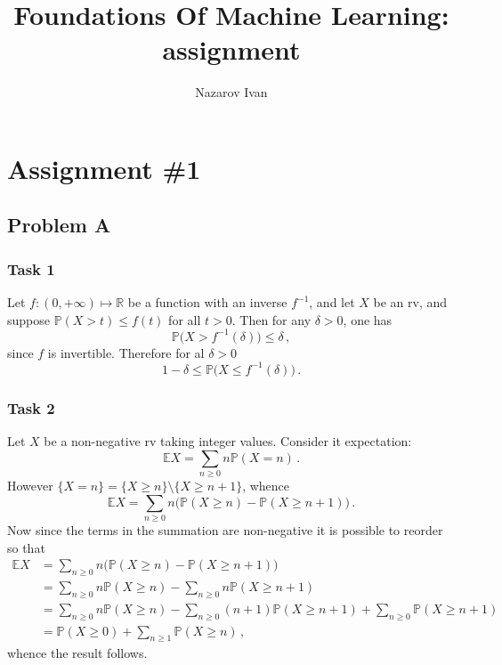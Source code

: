 \documentclass[a4paper]{article}
\title{Foundations Of Machine Learning: assignment}
\author{Nazarov Ivan}
\newcommand{\Real}{\mathbb{R}}
\newcommand{\ex}{\mathbb{E}}
\newcommand{\pr}{\mathbb{P}}
\begin{document}
\section{Assignment \#1} %
\label{sec:assignment_1}

\subsection{Problem A} %
\label{sub:problem_1a}

\subsubsection{Task 1} %
\label{ssub:task_1a1}

Let $f:(0, +\infty)\mapsto\Real$ be a function with an inverse $f^{-1}$, and let
$X$ be an rv, and suppose $\pr(X > t)\leq f(t)$ for all $t>0$. Then for any $\delta>0$,
one has
\[ \pr\bigl(X>f^{-1}(\delta)\bigr) \leq \delta \,, \]
since $f$ is invertible. Therefore for al $\delta>0$
\[ 1-\delta \leq \pr\bigl(X \leq f^{-1}(\delta)\bigr) \,. \]


\subsubsection{Task 2} %
\label{ssub:task_1a2}

Let $X$ be a non-negative rv taking integer values. Consider it expectation:
\[ \ex X = \sum_{n\geq 0} n \pr(X=n) \,. \]
However $\{X=n\} = \{X\geq n\}\setminus \{X\geq n+1\}$, whence
\[ \ex X = \sum_{n\geq 0} n \bigl(\pr(X\geq n) - \pr(X\geq n+1)\bigr) \,. \]
Now since the terms in the summation are non-negative it is possible to reorder
so that
\begin{align*}
	\ex X
    &= \sum_{n\geq 0} n \bigl(\pr(X\geq n) - \pr(X\geq n+1)\bigr) \\
    &= \sum_{n\geq 0} n \pr(X\geq n)
      - \sum_{n\geq 0} n \pr(X\geq n+1) \\
    &= \sum_{n\geq 0} n \pr(X\geq n)
      - \sum_{n\geq 0} (n+1) \pr(X\geq n+1)
      + \sum_{n\geq 0} \pr(X\geq n+1) \\
    &= \pr(X\geq 0) + \sum_{n\geq 1} \pr(X\geq n) \,,
\end{align*}
whence the result follows.


\end{document}
